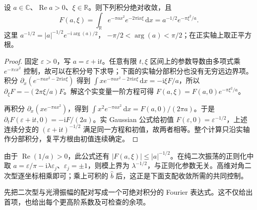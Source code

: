 \begin{proposition}\label{b2:prop:21-complex-gaussian}
设 \(a\in\mathbb C\)、\(\operatorname{Re}a>0\)、\(\xi\in\mathbb R\)。则下列积分绝对收敛，且
\[
 F(a,\xi)=\int_{\mathbb R}e^{-\pi a x^2}e^{-2\pi\mathrm ix\xi}\,\mathrm dx
 =a^{-1/2}e^{-\pi\xi^2/a}.
\]
这里 \(a^{-1/2}=|a|^{-1/2}e^{-\mathrm i\arg(a)/2}\)，
\(-\pi/2<\arg(a)<\pi/2\)；在正实轴上取正平方根。
\end{proposition}
\begin{proof}
固定 \(\varepsilon>0\)，写 \(a=\varepsilon+\mathrm it\)。任意有限 \(t,\xi\) 区间上的参数导数由多项式乘 \(e^{-\pi\varepsilon x^2}\) 控制，故可以在积分号下求导；下面的实轴分部积分也没有无穷远边界项。积分
\(\partial_x(e^{-\pi a x^2-2\pi\mathrm ix\xi})\) 得到
\(\int x e^{-\pi a x^2-2\pi\mathrm ix\xi}\,\mathrm dx=-\mathrm i\xi F/a\)，所以
\(\partial_\xi F=-(2\pi\xi/a)F\)。解这个实变量一阶方程可得
\(F(a,\xi)=F(a,0)e^{-\pi\xi^2/a}\)。

再积分 \(\partial_x(xe^{-\pi a x^2})\)，得到
\(\int x^2e^{-\pi a x^2}\,\mathrm dx=F(a,0)/(2\pi a)\)。于是
\(\partial_tF(\varepsilon+\mathrm it,0)=-\mathrm iF/(2a)\)。实 Gaussian 公式给初值 \(F(\varepsilon,0)=\varepsilon^{-1/2}\)，上述连续分支的 \((\varepsilon+\mathrm it)^{-1/2}\) 满足同一方程和初值，故两者相等。整个计算只沿实轴作分部积分，复平方根由初值连续确定。
\end{proof}
由于 \(\operatorname{Re}(1/a)>0\)，此公式还有
\( |F(a,\xi)|\leq |a|^{-1/2}\)。在纯二次振荡的正则化中取
\(a=\varepsilon/\pi-\mathrm i\lambda\varepsilon_j\)、\(\varepsilon_j=\pm1\)，则模上界为 \(\lambda^{-1/2}\)，与正则化参数无关。高维对角二次型逐坐标相乘即可；乘上可积的 \(\widehat b\) 后，这正是下面支配收敛所需的共同控制。

先把二次型与光滑振幅的配对写成一个可绝对积分的 Fourier 表达式。这不仅给出首项，也给出每个更高阶系数及可检查的余项。

